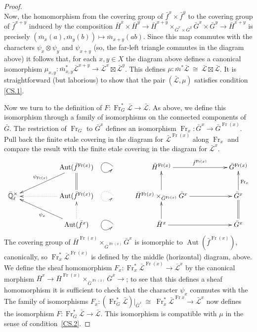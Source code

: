 \documentclass[11pt]{amsart}
\theoremstyle{plain}
\theoremstyle{definition}
\theoremstyle{remark}
\newcommand{\EE}{\mathbb{\bar Q}_\ell}
\newcommand{\Frob}{{\operatorname{Fr}}}
\DeclareMathOperator{\Aut}{Aut}
\newcommand{\iso}{{\ \cong\ }}
\newcommand{\gcs}[1]{{\mathcal{\bar #1}}}
\newcommand\Clifton[1]{\marginpar{\smaller\smaller CC: #1}}
\begin{document}
\begin{proof}
\[{}
\]
Now, the homomorphism from the covering group of ${\bar f}^x\times{\bar f}^y$ to the covering group of ${\bar f}^{x+y}$ induced by the composition $ {\bar H}^x\times {\bar H}^y \to {\bar H}^{x+y} \times_{{\bar G}^x\times{\bar G}^y} {\bar G}^x\times{\bar G}^y \to {\bar H}^{x+y}$ is precisely $({\bar m}_x(a),{\bar m}_y(b)) \mapsto {\bar m}_{x+y}(ab)$. Since this map commutes with the characters $\psi_x\otimes\psi_y$ and $\psi_{x+y}$ (so, the far-left triangle commutes in the diagram above) it follows that, for each $x,y\in X$ the diagram above defines a canonical isomorphism
$\mu_{x,y} : {\bar m}_{x,y}^* \gcs{L}^{x+y} \to \gcs{L}^x \boxtimes\gcs{L}^y$.
This defines $\mu: {\bar m}^* \gcs{L} \iso \gcs{L} \boxtimes\gcs{L}$. It is straightforward (but laborious) to show that the pair $(\gcs{L},\mu)$ satisfies condition \ref{CS.1}.

Now we turn to the definition of $F : \Frob_{G}^* \gcs{L} \to \gcs{L}$. As above, we define this isomorphism through a family of isomorphisms on the connected components of ${\bar G}$. The restriction of $\Frob_{G}$ to ${\bar G}^x$ defines an isomorphism $\Frob_x : {\bar G}^x \to {\bar G}^{\Frob(x)}$. 
Pull back the finite etale covering in the diagram for $\gcs{L}^{\Frob(x)}$ along $\Frob_x$ and compare the result with the finite etale covering in the diagram for $\gcs{L}^{x}$.
\[
\xymatrix{ 
  && \ar[dll]_{\psi_{\Frob(x)}} \Aut({\bar f}^{\Frob(x)}) & \ar@(ul,dl) & {\bar H}^{\Frob(x)} \ar[rr]^{{\bar f}^{\Frob(x)}} && {\bar G}^{\Frob(x)}\\ 
\EE^\times & & \ar@{.>}[ll] \Aut({\bar f}^{\Frob(x)})  \ar@{=}[u] & \ar@{.>}@(ul,dl)  & \ar[u] {\bar H}^{\Frob(x)} \times_{{\bar G}^{\Frob(x)}} {\bar G}^x \ar[rr] && \ar[u]_{\Frob_{x}} {\bar G}^x\\
& &  \ar[ull]^{\psi_x}  \ar@{.>}[u] \Aut({\bar f}^{x}) & \ar@(ul,dl) & \ar[u] {\bar H}^x \ar[rr] && \ar@{=} [u] {\bar G}^x\\
}
\] 
The covering group of ${\bar H}^{\Frob(x)} \times_{{\bar G}^{\Frob(x)}} {\bar G}^x$ is isomorphic to $\Aut({\bar f}^{\Frob(x)})$, canonically, so $\Frob_x^* \gcs{L}^{\Frob(x)}$ is defined by the middle (horizontal) diagram, above.  We define the sheaf homomorphism $F_x : \Frob_x^* \gcs{L}^{\Frob(x)} \to \gcs{L}^x$ by the canonical morphism ${\bar H}^x \to  {\bar H}^{\Frob(x)} \times_{{\bar G}^{\Frob(x)}} {\bar G}^x \to $; to see that this defines a sheaf homomorphism it is sufficient to check that the character $\psi_x$ commutes with the  
The family of isomorphisms  $F_x : (\Frob_{G}^* \gcs{L})\vert_{{\bar G}^x} \iso \Frob_x^* \gcs{L}^{\Frob{x}} \to \gcs{L}^x$ now defines the isomorphism $F : \Frob_{G}^* \gcs{L} \to \gcs{L}$. 
\Clifton{Add some detail here.}
This isomorphism is compatible with $\mu$ in the sense of condition~\ref{CS.2}. 
\end{proof}
\end{document}

